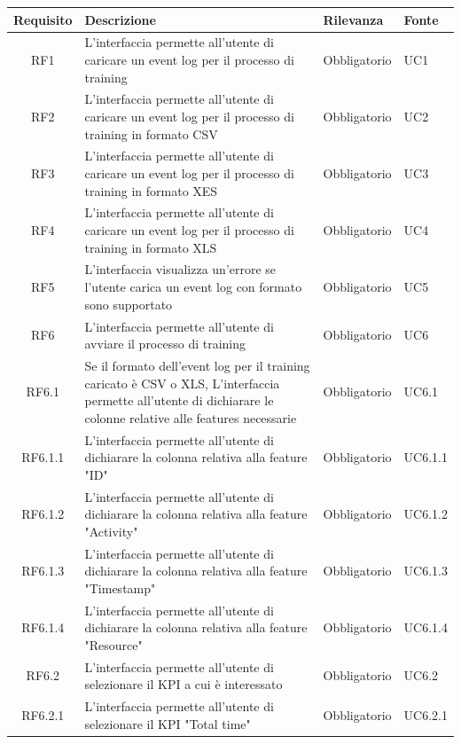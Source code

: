 \begin{longtable}{cp{8cm}ll}
\hline
\hline
\textbf{Requisito} & \textbf{Descrizione} &  \textbf{Rilevanza} & \textbf{Fonte}\\
\hline
RF1 & L'interfaccia permette all'utente di caricare un event log per il processo di training & Obbligatorio & UC1 \\
\hline
RF2 & L'interfaccia permette all'utente di caricare un event log per il processo di training in formato CSV & Obbligatorio & UC2 \\
\hline
RF3 & L'interfaccia permette all'utente di caricare un event log per il processo di training in formato XES & Obbligatorio & UC3 \\
\hline
RF4 & L'interfaccia permette all'utente di caricare un event log per il processo di training in formato XLS & Obbligatorio & UC4 \\
\hline
RF5 & L'interfaccia visualizza un'errore se l'utente carica un event log con formato sono supportato & Obbligatorio & UC5 \\
\hline
RF6 & L'interfaccia permette all'utente di avviare il processo di training & Obbligatorio & UC6 \\
\hline
RF6.1 & Se il formato dell'event log per il training caricato è CSV o XLS, L'interfaccia permette all'utente di dichiarare le colonne relative alle features necessarie & Obbligatorio & UC6.1 \\
\hline 
RF6.1.1 & L'interfaccia permette all'utente di dichiarare la colonna relativa alla feature "ID" & Obbligatorio & UC6.1.1 \\
\hline
RF6.1.2 & L'interfaccia permette all'utente di dichiarare la colonna relativa alla feature "Activity" & Obbligatorio & UC6.1.2 \\
\hline
RF6.1.3 & L'interfaccia permette all'utente di dichiarare la colonna relativa alla feature "Timestamp" & Obbligatorio & UC6.1.3 \\
\hline
RF6.1.4 & L'interfaccia permette all'utente di dichiarare la colonna relativa alla feature "Resource" & Obbligatorio & UC6.1.4 \\
\hline
RF6.2 & L'interfaccia permette all'utente di selezionare il KPI a cui è interessato & Obbligatorio & UC6.2 \\
\hline
RF6.2.1 & L'interfaccia permette all'utente di selezionare il KPI "Total time" & Obbligatorio & UC6.2.1 \\

\end{longtable}
